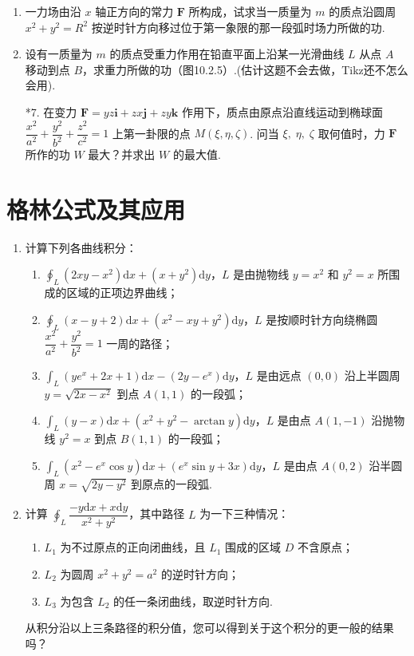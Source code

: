\begin{enumerate}
    \item 一力场由沿 $x$ 轴正方向的常力 $\boldsymbol{F}$ 所构成，试求当一质量为 $m$ 的质点沿圆周 $x^2+y^2=R^2$ 按逆时针方向移过位于第一象限的那一段弧时场力所做的功.
    
    \item 设有一质量为 $m$ 的质点受重力作用在铅直平面上沿某一光滑曲线 $L$ 从点 $A$ 移动到点 $B$，求重力所做的功（图10.2.5）.(估计这题不会去做，Tikz还不怎么会用).
    
    \item[*7.] 在变力 $\boldsymbol{F}=yz\boldsymbol{i}+zx\boldsymbol{j}+zy\boldsymbol{k}$ 作用下，质点由原点沿直线运动到椭球面 $\dfrac{x^2}{a^2}+\dfrac{y^2}{b^2}+\dfrac{z^2}{c^2}=1$ 上第一卦限的点 $M(\xi, \eta, \zeta)$. 
    问当 $\xi,\;\eta,\;\zeta$ 取何值时，力 $\boldsymbol{F}$ 所作的功 $W$ 最大？并求出 $W$ 的最大值.
\end{enumerate}

\section{格林公式及其应用}

\begin{enumerate}\setlength{\itemsep}{7pt}
    \item 计算下列各曲线积分：
    \begin{enumerate}[(1)]\setlength{\itemsep}{5pt}\setlength{\topsep}{15pt}
        \item $\displaystyle\oint_{L}(2xy-x^2)\text{d}x+(x+y^2)\text{d}y$，$L$ 是由抛物线 $y=x^2$ 和 $y^2=x$ 所围成的区域的正项边界曲线；
        \item $\displaystyle\oint_{L}(x-y+2)\text{d}x+(x^2-xy+y^2)\text{d}y$，$L$ 是按顺时针方向绕椭圆 $\dfrac{x^2}{a^2}+\dfrac{y^2}{b^2}=1$ 一周的路径；
        \item $\displaystyle\int_{L}(ye^x+2x+1)\text{d}x-(2y-e^x)\text{d}y$，$L$ 是由远点 $(0, 0)$ 沿上半圆周 $y=\sqrt{2x-x^2}$ 到点 $A(1, 1)$ 的一段弧；
        \item $\displaystyle\int_{L}(y-x)\text{d}x+(x^2+y^2-\arctan y)\text{d}y$，$L$ 是由点 $A(1, -1)$ 沿抛物线 $y^2=x$ 到点 $B(1, 1)$ 的一段弧；
        \item $\displaystyle\int_{L}(x^2-e^x\cos y)\text{d}x+(e^x\sin y+3x)\text{d}y$，$L$ 是由点 $A(0, 2)$ 沿半圆周 $x=\sqrt{2y-y^2}$ 到原点的一段弧.
    \end{enumerate}

    \item 计算 $\displaystyle\oint_{L}\dfrac{-y\text{d}x+x\text{d}y}{x^2+y^2}$，其中路径 $L$ 为一下三种情况：
    \begin{enumerate}[(1)]\setlength{\itemsep}{5pt}\setlength{\topsep}{15pt}
        \item $L_1$ 为不过原点的正向闭曲线，且 $L_1$ 围成的区域 $D$ 不含原点；
        \item $L_2$ 为圆周 $x^2+y^2=a^2$ 的逆时针方向；
        \item $L_3$ 为包含 $L_2$ 的任一条闭曲线，取逆时针方向.
    \end{enumerate}
    从积分沿以上三条路径的积分值，您可以得到关于这个积分的更一般的结果吗？
\end{enumerate}

